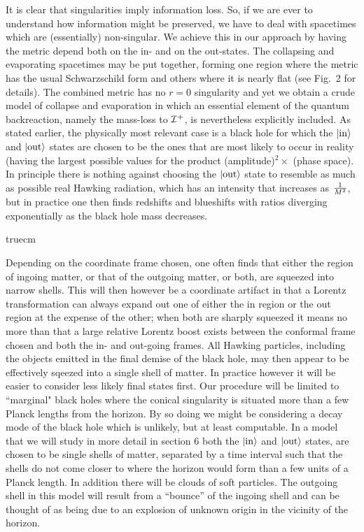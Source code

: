 It is clear that singularities imply information loss. So, if we are
ever to understand how information might be preserved, we have to deal
with spacetimes which are (essentially) non-singular. We achieve this
in our approach by having the metric depend both on the in- and on the
out-states. The collapsing and evaporating spacetimes may be put
together, forming one region where the metric has the usual
Schwarzschild form and others where it is nearly flat (see Fig.~2 for
details). The combined metric has no $r=0$ singularity and yet we
obtain a crude model of collapse and evaporation in which an essential
element of the quantum backreaction, namely the mass-loss to
$\cal{I}^+$, is nevertheless explicitly included.  As stated earlier,
the physically most relevant case is a black hole for which the
$\left|{\rm in}\right>$ and $\left|{\rm out}\right>$ states are chosen
to be the ones that are most likely to occur in reality (having the
largest possible values for the product
(amplitude)$^2 \times$ (phase space). In principle there is nothing
against choosing the $\left|{\rm out}\right>$ state to resemble as
much as possible real Hawking radiation, which has an intensity that
increases as $1\over M^2$, but in practice one then finds redshifts and
blueshifts with ratios diverging exponentially as the black hole mass
decreases.

\midinsert
{} truecm

\endinsert

Depending on the coordinate frame chosen, one often finds
that either the region of ingoing matter, or that of the outgoing
matter, or both, are squeezed into narrow shells. This will then
however be a coordinate artifact in that a Lorentz transformation can
always expand out one of  either the in region or the out region at
the expense of the other;  when both are sharply squeezed it means
no more than that a large relative Lorentz boost exists between the
conformal frame chosen and both the in- and out-going frames. All
Hawking particles, including the objects emitted in the final demise of
the black hole, may then appear to be effectively sqeezed into a
single shell of matter. In practice however it will be easier to
consider less likely final states first. Our procedure will be limited
to ``marginal" black holes where the conical singularity is situated
more than a few Planck lengths from the horizon. By so doing we might
be considering a decay mode of the black hole which is unlikely, but at
least computable. In a model that we will study in more detail in
section 6 both the $\left|{\rm in}\right>$ and $\left|{\rm out}\right>$
states, are chosen to be single shells of matter, separated by a time
interval such that the shells do not come closer to where the horizon
would form than a few units of a Planck length. In addition there will
be clouds of soft particles. The outgoing shell in this model will
result from a ``bounce'' of the ingoing shell and can be thought of as
being due to an explosion of unknown origin in the vicinity of the
horizon.

